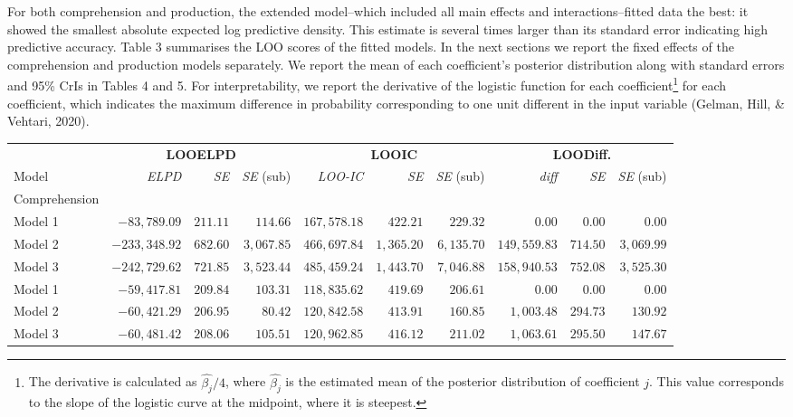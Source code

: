 \documentclass[
  english,
  man,man,floatsintext]{apa6}
\begin{document}
For both comprehension and production, the extended model--which included all main effects and interactions--fitted data the best: it showed the smallest absolute expected log predictive density. This estimate is several times larger than its standard error indicating high predictive accuracy. Table 3 summarises the LOO scores of the fitted models. In the next sections we report the fixed effects of the comprehension and production models separately. We report the mean of each coefficient's posterior distribution along with standard errors and 95\% CrIs in Tables 4 and 5. For interpretability, we report the derivative of the logistic function for each coefficient\footnote{The derivative is calculated as \(\hat{\beta_j}/4\), where \(\hat{\beta_j}\) is the estimated mean of the posterior distribution of coefficient \(j\). This value corresponds to the slope of the logistic curve at the midpoint, where it is steepest.} for each coefficient, which indicates the maximum difference in probability corresponding to one unit different in the input variable (Gelman, Hill, \& Vehtari, 2020).

\captionsetup[table]{labelformat=empty,skip=1pt}
\begin{longtable}{lrrrrrrrrr}
\toprule
& \multicolumn{3}{c}{\textbf{LOOELPD}} & \multicolumn{3}{c}{\textbf{LOOIC}} & \multicolumn{3}{c}{\textbf{LOODiff.}} \\ 
 \cmidrule(lr){2-4}\cmidrule(lr){5-7}\cmidrule(lr){8-10}
Model & \emph{ELPD} & \emph{SE} & \emph{SE} (sub) & \emph{LOO-IC} & \emph{SE} & \emph{SE} (sub) & \emph{diff} & \emph{SE} & \emph{SE} (sub) \\ 
\midrule
\multicolumn{1}{l}{Comprehension} \\ 
\midrule
Model 1 & $-83,789.09$ & $211.11$ & $114.66$ & $167,578.18$ & $422.21$ & $229.32$ & $0.00$ & $0.00$ & $0.00$ \\ 
Model 2 & $-233,348.92$ & $682.60$ & $3,067.85$ & $466,697.84$ & $1,365.20$ & $6,135.70$ & $149,559.83$ & $714.50$ & $3,069.99$ \\ 
Model 3 & $-242,729.62$ & $721.85$ & $3,523.44$ & $485,459.24$ & $1,443.70$ & $7,046.88$ & $158,940.53$ & $752.08$ & $3,525.30$ \\ 
Model 1 & $-59,417.81$ & $209.84$ & $103.31$ & $118,835.62$ & $419.69$ & $206.61$ & $0.00$ & $0.00$ & $0.00$ \\ 
Model 2 & $-60,421.29$ & $206.95$ & $80.42$ & $120,842.58$ & $413.91$ & $160.85$ & $1,003.48$ & $294.73$ & $130.92$ \\ 
Model 3 & $-60,481.42$ & $208.06$ & $105.51$ & $120,962.85$ & $416.12$ & $211.02$ & $1,063.61$ & $295.50$ & $147.67$ \\ 
\bottomrule
\end{longtable}
\end{document}
